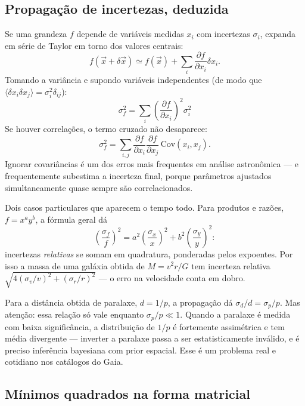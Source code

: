 \documentclass[11pt,a4paper]{article}
\begin{document}
\subsection*{Propagação de incertezas, deduzida}

Se uma grandeza $f$ depende de variáveis medidas $x_i$ com incertezas $\sigma_i$, expanda em série de Taylor em torno dos valores centrais:
\[
f(\vec{x}+\delta\vec{x})\simeq f(\vec{x})+\sum_i\frac{\partial f}{\partial x_i}\delta x_i.
\]
Tomando a variância e supondo variáveis independentes (de modo que $\langle\delta x_i\delta x_j\rangle=\sigma_i^{2}\delta_{ij}$):
\[
\boxed{\ \sigma_f^{2}=\sum_i\left(\frac{\partial f}{\partial x_i}\right)^{2}\sigma_i^{2}\ }
\]
Se houver correlações, o termo cruzado não desaparece:
\[
\sigma_f^{2}=\sum_{i,j}\frac{\partial f}{\partial x_i}\frac{\partial f}{\partial x_j}\,\mathrm{Cov}(x_i,x_j).
\]
Ignorar covariâncias é um dos erros mais frequentes em análise astronômica --- e frequentemente subestima a incerteza final, porque parâmetros ajustados simultaneamente quase sempre são correlacionados.

Dois casos particulares que aparecem o tempo todo. Para produtos e razões, $f=x^{a}y^{b}$, a fórmula geral dá
\[
\left(\frac{\sigma_f}{f}\right)^{2}=a^{2}\left(\frac{\sigma_x}{x}\right)^{2}+b^{2}\left(\frac{\sigma_y}{y}\right)^{2}:
\]
incertezas \emph{relativas} se somam em quadratura, ponderadas pelos expoentes. Por isso a massa de uma galáxia obtida de $M=v^{2}r/G$ tem incerteza relativa $\sqrt{4(\sigma_v/v)^{2}+(\sigma_r/r)^{2}}$ --- o erro na velocidade conta em dobro.

Para a distância obtida de paralaxe, $d=1/p$, a propagação dá $\sigma_d/d=\sigma_p/p$. Mas atenção: essa relação só vale enquanto $\sigma_p/p\ll1$. Quando a paralaxe é medida com baixa significância, a distribuição de $1/p$ é fortemente assimétrica e tem média divergente --- inverter a paralaxe passa a ser estatisticamente inválido, e é preciso inferência bayesiana com prior espacial. Esse é um problema real e cotidiano nos catálogos do Gaia.

\subsection*{Mínimos quadrados na forma matricial}
\end{document}
